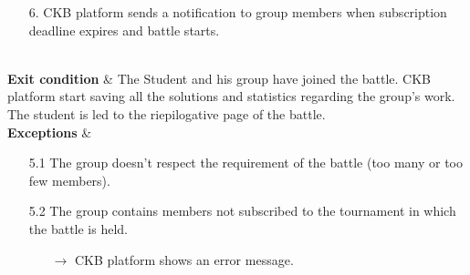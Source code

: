 \documentclass{article}
\begin{document}
{\begin{enumerate}
\begin{xltabular}{\textwidth}
\begin{enumerate}
                                                        members.
                                                        \item[6.] CKB platform sends a notification to group members
                                                        when subscription deadline expires and battle starts.
                                                    \end{enumerate} \\
                        \hline
                        \textbf{Exit condition} & The Student and his group have joined the battle.
                        CKB platform start saving all the solutions and statistics regarding the group's
                        work. The student is led to the riepilogative page of the battle.\\
                        \hline
                        \textbf{Exceptions} &    \begin{itemize}
                                                    \item[5.1] The group doesn't respect the requirement of the battle
                                                    (too many or too few members).
                                                    \item[5.2] The group contains members not subscribed to the tournament in which
                                                    the battle is held.
                                                    \begin{itemize}
                                                        \item[$\rightarrow$] CKB platform shows an error message.
                                                    \end{itemize} 
                                                \end{itemize}
                    \end{xltabular}
                    

\end{enumerate}}
\end{document}
